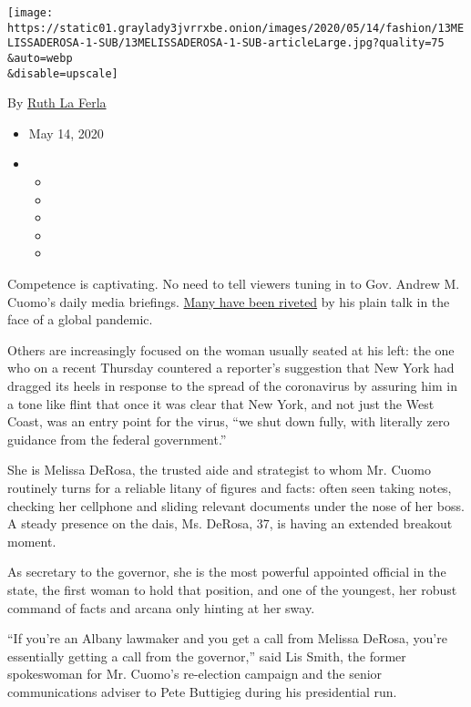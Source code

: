 \texttt{[image: https://static01.graylady3jvrrxbe.onion/images/2020/05/14/fashion/13MELISSADEROSA-1-SUB/13MELISSADEROSA-1-SUB-articleLarge.jpg?quality=75\\\&auto=webp\\\&disable=upscale]}

By \href{https://www.nytimes3xbfgragh.onion/by/ruth-la-ferla}{Ruth La
Ferla}

\begin{itemize}
\item
  May 14, 2020
\item
  \begin{itemize}
  \item
  \item
  \item
  \item
  \item
  \end{itemize}
\end{itemize}

Competence is captivating. No need to tell viewers tuning in to Gov.
Andrew M. Cuomo's daily media briefings.
\href{https://www.nytimes3xbfgragh.onion/2020/03/30/us/politics/andrew-cuomo.html}{Many
have been riveted} by his plain talk in the face of a global pandemic.

Others are increasingly focused on the woman usually seated at his left:
the one who on a recent Thursday countered a reporter's suggestion that
New York had dragged its heels in response to the spread of the
coronavirus by assuring him in a tone like flint that once it was clear
that New York, and not just the West Coast, was an entry point for the
virus, ``we shut down fully, with literally zero guidance from the
federal government.''

She is Melissa DeRosa, the trusted aide and strategist to whom Mr. Cuomo
routinely turns for a reliable litany of figures and facts: often seen
taking notes, checking her cellphone and sliding relevant documents
under the nose of her boss. A steady presence on the dais, Ms. DeRosa,
37, is having an extended breakout moment.

As secretary to the governor, she is the most powerful appointed
official in the state, the first woman to hold that position, and one of
the youngest, her robust command of facts and arcana only hinting at her
sway.

``If you're an Albany lawmaker and you get a call from Melissa DeRosa,
you're essentially getting a call from the governor,'' said Lis Smith,
the former spokeswoman for Mr. Cuomo's re-election campaign and the
senior communications adviser to Pete Buttigieg during his presidential
run.

